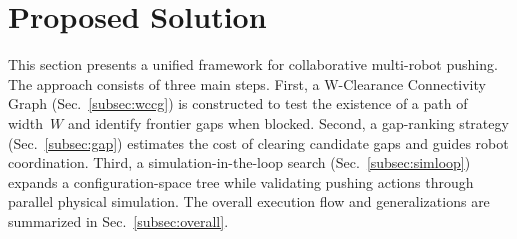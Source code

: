 \section{Proposed Solution}\label{sec:solution}

This section presents a unified framework for collaborative multi-robot pushing.
The approach consists of three main steps. First, a W-Clearance Connectivity Graph
(Sec.~\ref{subsec:wccg}) is constructed to test the existence of a path of width~$W$
and identify frontier gaps when blocked. Second, a gap-ranking strategy
(Sec.~\ref{subsec:gap}) estimates the cost of clearing candidate gaps and
guides robot coordination. Third, a simulation-in-the-loop search
(Sec.~\ref{subsec:simloop}) expands a configuration-space tree while validating
pushing actions through parallel physical simulation. The overall execution flow
and generalizations are summarized in Sec.~\ref{subsec:overall}.





